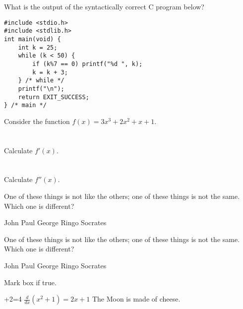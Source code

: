 \documentclass[12pt]{exam}
\begin{document}

\begin{questions}

\question[2] What is the output of the syntactically correct C program below?
\vspace{0.3cm}
\begin{lstlisting}
#include <stdio.h>
#include <stdlib.h>
int main(void) {
	int k = 25;
	while (k < 50) {
		if (k%7 == 0) printf("%d ", k);
		k = k + 3;
	} /* while */
	printf("\n");
	return EXIT_SUCCESS;
} /* main */
\end{lstlisting}
\addpoints

\question[20] Consider the function $f(x)=3x^3+2x^2+x+1$.
\noaddpoints %
\begin{parts}
\part[10]{} Calculate $f'(x)$.
\part[10]{} Calculate $f''(x)$.
\end{parts}
\addpoints

\question[2] One of these things is not like the others; one of these
things is not the same. Which one is different?
\begin{choices}
\choice John
\choice Paul
\choice George
\choice Ringo
\choice Socrates
\end{choices}

\question[2] One of these things is not like the others; one of these
things is not the same. Which one is different?
\begin{oneparchoices}
\choice John
\choice Paul
\choice George
\choice Ringo
\choice Socrates
\end{oneparchoices}

\question[3] Mark box if true.
\addpoints
\begin{checkboxes}
+2=4
\choice $\frac{d}{dx} (x^2+1) = 2x+1$
\choice The Moon is made of cheese.
\end{checkboxes}


\end{questions}
\end{document}
